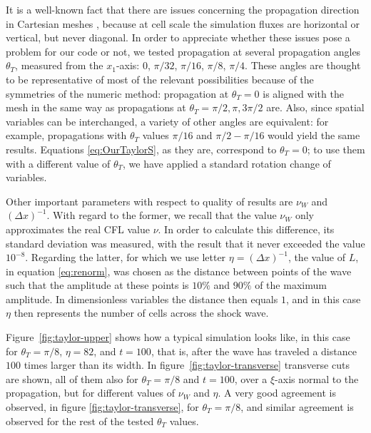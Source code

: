 It is a well-known fact that there are issues concerning the propagation direction in Cartesian meshes \citep{huijssen2010iterative,pinton2009heterogeneous}, because at cell scale the simulation fluxes are horizontal or vertical, but never diagonal. 
In order to appreciate whether these issues pose a problem for our code or not, we tested propagation at several propagation angles $\theta_T$, measured from the $x_1$-axis: 
$0$, $\pi/32$, $\pi/16$, $\pi/8$, $\pi/4$. 
These angles are thought to be representative of most of the relevant possibilities because of the symmetries of the numeric method: 
propagation at $\theta_T=0$ is aligned with the mesh in the same way as propagations at $\theta_T=\pi/2,\pi,3\pi/2$ are. 
Also, since spatial variables can be interchanged, a variety of other angles are equivalent: for example, propagations with $\theta_T$ values $\pi/16$ and $\pi/2 - \pi/16$ would yield the same results.  
Equations \eqref{eq:OurTaylorS}, as they are, correspond to $\theta_T=0$; to use them with a different value of $\theta_T$, we have applied a standard rotation change of variables.

Other important parameters with respect to quality of results are $\nu_W$ and $(\Delta x)^{-1}$. With regard to the former, we recall that the value $\nu_W$ only approximates the real CFL value $\nu$. 
In order to calculate this difference, its standard deviation was measured, with the result that it never exceeded the value $10^{-8}$.
Regarding the latter, for which we use letter $\eta = (\Delta x)^{-1}$, the value of $L$, in equation \eqref{eq:renorm}, was chosen as the distance between points of the wave such that the amplitude at these points is $10\%$ and $90\%$ of the maximum amplitude. 
In dimensionless variables the distance then equals $1$, and in this case $\eta$ then represents the number of cells across the shock wave.

Figure~\ref{fig:taylor-upper} shows how a typical simulation looks like, in this case for $\theta_T = \pi/8$, $\eta=82$, and $t=100$, that is, after the wave has traveled a distance $100$ times larger than its width. 
In figure~\ref{fig:taylor-transverse} transverse cuts are shown, all of them also for $\theta_T=\pi/8$ and $t=100$, over a $\xi$-axis normal to the propagation, but for different values of $\nu_W$ and $\eta$. 
A very good agreement is observed, in figure \ref{fig:taylor-transverse}, for $\theta_T=\pi/8$, and similar agreement is observed for the rest of the tested $\theta_T$ values.

